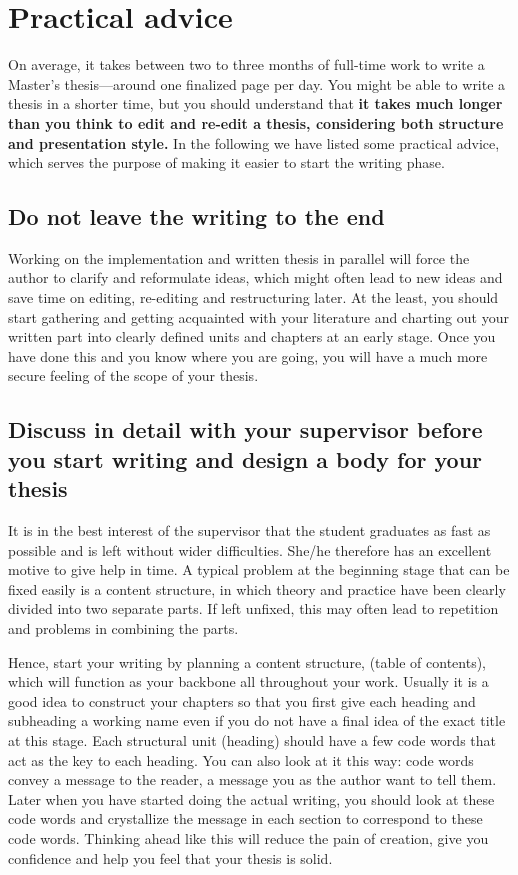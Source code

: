 \section{Practical advice}

On average, it takes between two to three months of full-time work to
write a Master’s thesis---around one finalized page per day. You
might be able to write a thesis in a shorter time, but you should
understand that \textbf{it takes much longer than you think to edit
and re-edit a thesis, considering both structure and presentation
style.} In the following we have listed some practical advice, which
serves the purpose of making it easier to start the writing phase.

\subsection{Do not leave the writing to the end}

Working on the implementation and written thesis in parallel will
force the author to clarify and reformulate ideas, which might often
lead to new ideas and save time on editing, re-editing and
restructuring later. At the least, you should start gathering and
getting acquainted with your literature and charting out your written
part into clearly defined units and chapters at an early stage. Once
you have done this and you know where you are going, you will have a
much more secure feeling of the scope of your thesis.

\subsection{Discuss in detail with your supervisor before you start writing and design a body for your thesis}

It is in the best interest of the supervisor that the student
graduates as fast as possible and is left without wider difficulties.
She/he therefore has an excellent motive to give help in time. A
typical problem at the beginning stage that can be fixed easily is a
content structure, in which theory and practice have been clearly
divided into two separate parts. If left unfixed, this may often lead
to repetition and problems in combining the parts.

Hence, start your writing by planning a content structure, (table of
contents), which will function as your backbone all throughout your
work. Usually it is a good idea to construct your chapters so that
you first give each heading and subheading a working name even if you
do not have a final idea of the exact title at this stage. Each
structural unit (heading) should have a few code words that act as
the key to each heading. You can also look at it this way: code words
convey a message to the reader, a message you as the author want to
tell them. Later when you have started doing the actual writing, you
should look at these code words and crystallize the message in each
section to correspond to these code words. Thinking ahead like this
will reduce the pain of creation, give you confidence and help you
feel that your thesis is solid.

